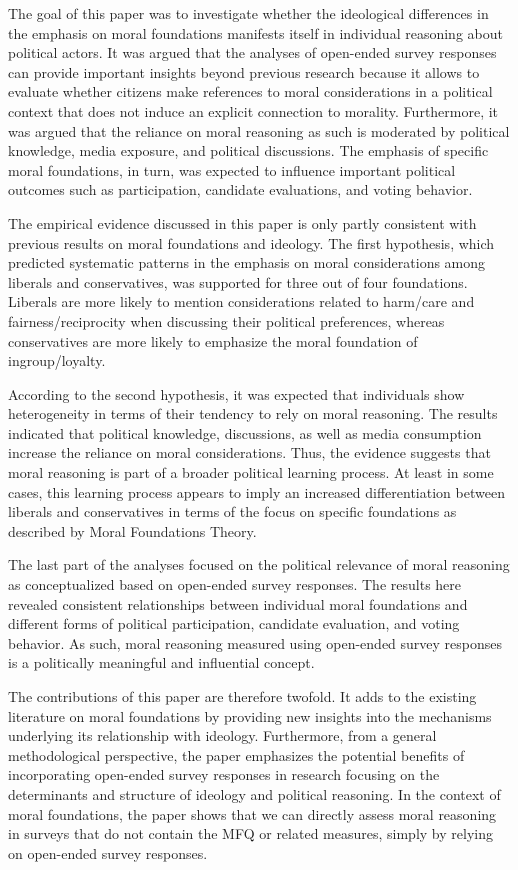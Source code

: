 \documentclass[12pt]{article}
\begin{document}
The goal of this paper was to investigate whether the ideological differences in the emphasis on moral foundations manifests itself in individual reasoning about political actors. It was argued that the analyses of open-ended survey responses can provide important insights beyond previous research because it allows to evaluate whether citizens make references to moral considerations in a political context that does not induce an explicit connection to morality. Furthermore, it was argued that the reliance on moral reasoning as such is moderated by political knowledge, media exposure, and political discussions. The emphasis of specific moral foundations, in turn, was expected to influence important political outcomes such as participation, candidate evaluations, and voting behavior.

The empirical evidence discussed in this paper is only partly consistent with previous results on moral foundations and ideology. The first hypothesis, which predicted systematic patterns in the emphasis on moral considerations among liberals and conservatives, was supported for three out of four foundations. Liberals are more likely to mention considerations related to harm/care and fairness/reciprocity when discussing their political preferences, whereas conservatives are more likely to emphasize the moral foundation of ingroup/loyalty.

According to the second hypothesis, it was expected that individuals show heterogeneity in terms of their tendency to rely on moral reasoning. The results indicated that political knowledge, discussions, as well as media consumption increase the reliance on moral considerations. Thus, the evidence suggests that moral reasoning is part of a broader political learning process. At least in some cases, this learning process appears to imply an increased differentiation between liberals and conservatives in terms of the focus on specific foundations as described by Moral Foundations Theory.

The last part of the analyses focused on the political relevance of moral reasoning as conceptualized based on open-ended survey responses. The results here revealed consistent relationships between individual moral foundations and different forms of political participation, candidate evaluation, and voting behavior. As such, moral reasoning measured using open-ended survey responses is a politically meaningful and influential concept.

The contributions of this paper are therefore twofold. It adds to the existing literature on moral foundations by providing new insights into the mechanisms underlying its relationship with ideology. Furthermore, from a general methodological perspective, the paper emphasizes the potential benefits of incorporating open-ended survey responses in research focusing on the determinants and structure of ideology and political reasoning. In the context of moral foundations, the paper shows that we can directly assess moral reasoning in surveys that do not contain the MFQ or related measures, simply by relying on open-ended survey responses.
\end{document}
